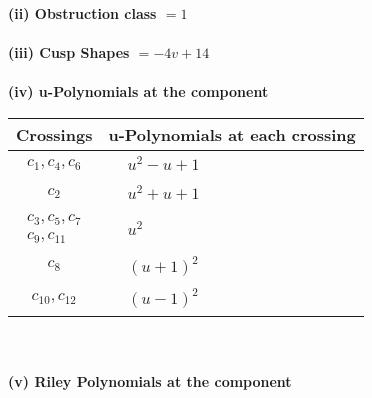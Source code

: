 \documentclass[1p]{elsarticle_modified}
\theoremstyle{definition}
\begin{document}
\flushleft \textbf{(ii) Obstruction class $= 1$}\\~\\
\flushleft \textbf{(iii) Cusp Shapes $= -4 v+14$}\\~\\
\newpage\renewcommand{\arraystretch}{1}
\flushleft \textbf{(iv) u-Polynomials at the component}\newline \\
\begin{tabular}{m{50pt}|m{274pt}}
Crossings & \hspace{64pt}u-Polynomials at each crossing \\
\hline $$\begin{aligned}c_{1},c_{4},c_{6}\end{aligned}$$&$\begin{aligned}
&u^2- u+1
\end{aligned}$\\
\hline $$\begin{aligned}c_{2}\end{aligned}$$&$\begin{aligned}
&u^2+u+1
\end{aligned}$\\
\hline $$\begin{aligned}c_{3},c_{5},c_{7}\\c_{9},c_{11}\end{aligned}$$&$\begin{aligned}
&u^2
\end{aligned}$\\
\hline $$\begin{aligned}c_{8}\end{aligned}$$&$\begin{aligned}
&(u+1)^2
\end{aligned}$\\
\hline $$\begin{aligned}c_{10},c_{12}\end{aligned}$$&$\begin{aligned}
&(u-1)^2
\end{aligned}$\\
\hline
\end{tabular}\\~\\
\newpage\renewcommand{\arraystretch}{1}
\flushleft \textbf{(v) Riley Polynomials at the component}\newline \\
\end{document}

